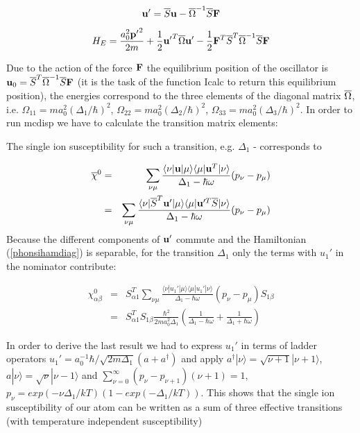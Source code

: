 \begin{equation}
 \mathbf u'=\overline{S} \mathbf u -\overline{\Omega}^{-1} \overline{S} \mathbf F
\end{equation}

\begin{equation}\label{phonsihamdiag}
H_E=\frac{a_0^2{\mathbf p'}^2}{2m}+\frac{1}{2} {\mathbf u'}^T \overline{\Omega} {\mathbf u'} 
-\frac{1}{2}\mathbf F^T \overline{S}^T \overline{\Omega}^{-1} \overline{S} \mathbf F
\end{equation}

Due to the action of the force $\mathbf F$ the equilibrium position of the oscillator
is $\mathbf u_0=\overline{S}^T\overline{\Omega}^{-1}\overline{S}\mathbf F$ (it is the task of the function
{\prg Icalc} to return this equilibrium position), the energies correspond to the three elements
of the diagonal matrix $\overline{\Omega}$, i.e. $\Omega_{11}=m a_0^2 (\Delta_1 /\hbar)^2$,
$\Omega_{22}=m a_0^2 (\Delta_2 /\hbar)^2$,
$\Omega_{33}=m a_0^2 (\Delta_3 /\hbar)^2$. In order to run {\prg mcdisp} we
have to calculate the transition matrix elements:

The single ion susceptibility for such a transition, e.g. $\Delta_1$ - corresponds to

\begin{eqnarray}
\overline{\chi}^0&=&\sum_{\nu\mu}\frac{\langle \nu|\mathbf u|\mu\rangle\langle \mu |\mathbf u^T|\nu \rangle}{\Delta_1 -\hbar \omega}
(p_{\nu} -p_{\mu}) \\
&=&\sum_{\nu\mu}\frac{\langle \nu|\overline{S}^T \mathbf u'|\mu\rangle\langle \mu |\mathbf u'^T \overline{S}|\nu \rangle}{\Delta_1 -\hbar \omega}
(p_{\nu} -p_{\mu}) 
\end{eqnarray}
Because the different components of $\mathbf u'$ commute and the Hamiltonian (\ref{phonsihamdiag})
is separable, for the transition $\Delta_1$ only the terms with $u_1'$ in the nominator
contribute:

\begin{eqnarray}
\chi^0_{\alpha\beta}&=&S^T_{\alpha1}\sum_{\nu\mu}\frac{\langle \nu|u_1'|\mu\rangle\langle \mu | u_1'|\nu \rangle}{\Delta_1 -\hbar \omega}
(p_{\nu} -p_{\mu}) S_{1\beta}\\
&=& S^T_{\alpha1}S_{1\beta}\frac{\hbar^2}{2ma_0^2\Delta_1}\left(\frac{1}{\Delta_1-\hbar\omega}+\frac{1}{\Delta_1+\hbar\omega}\right )
\end{eqnarray}

In order to derive the last result we had to express $u_1'$ in terms of ladder  operators
$u_1'=a_0^{-1} \hbar/\sqrt{2m\Delta_1}(a+a^{\dagger})$ and  apply $a^{\dagger}|\nu\rangle=\sqrt{\nu+1}|\nu+1\rangle$,
$a|\nu\rangle=\sqrt{\nu}|\nu-1\rangle$ and $\sum_{\nu=0}^{\infty}(p_{\nu}-p_{\nu+1})(\nu+1)=1$,
$p_{\nu}=exp(-\nu\Delta_1/kT)(1-exp(-\Delta_1/kT))$. This shows that the single ion susceptibility
of our atom can be written as a sum of three effective transitions (with temperature independent
susceptibility)

